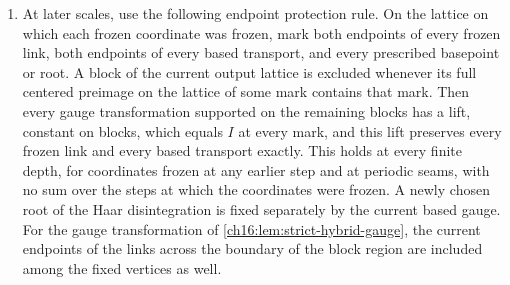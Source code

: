 \begin{theorem}
\begin{enumerate}
\item At later scales, use the following endpoint protection rule. On the lattice on which each frozen coordinate was frozen, mark both endpoints of every frozen link, both endpoints of every based transport, and every prescribed basepoint or root. A block of the current output lattice is excluded whenever its full centered preimage on the lattice of some mark contains that mark. Then every gauge transformation supported on the remaining blocks has a lift, constant on blocks, which equals $I$ at every mark, and this lift preserves every frozen link and every based transport exactly. This holds at every finite depth, for coordinates frozen at any earlier step and at periodic seams, with no sum over the steps at which the coordinates were frozen. A newly chosen root of the Haar disintegration is fixed separately by the current based gauge. For the gauge transformation of \cref{ch16:lem:strict-hybrid-gauge}, the current endpoints of the links across the boundary of the block region are included among the fixed vertices as well.
\end{enumerate}
\end{theorem}

